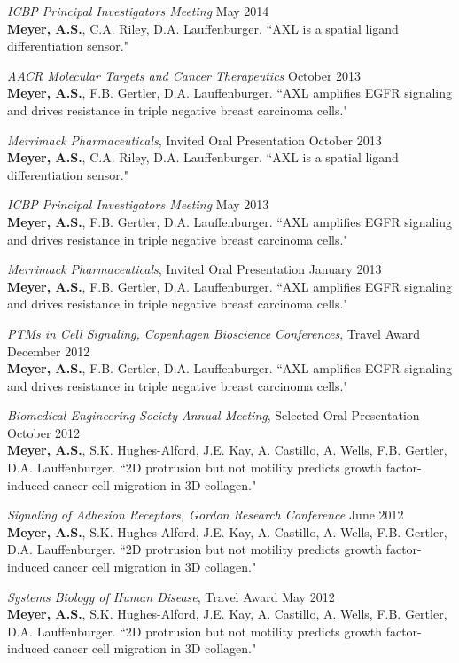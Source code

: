 \documentclass[11pt]{res}
\begin{document}
\begin{resume}
{\sl ICBP Principal Investigators Meeting} \hfill May 2014 \\
{\bf Meyer, A.S.}, C.A. Riley, D.A. Lauffenburger. ``AXL is a spatial ligand differentiation sensor."

{\sl AACR Molecular Targets and Cancer Therapeutics} \hfill October 2013 \\
{\bf Meyer, A.S.}, F.B. Gertler, D.A. Lauffenburger. ``AXL amplifies EGFR signaling and drives resistance in triple negative breast carcinoma cells."

{\sl Merrimack Pharmaceuticals}, Invited Oral Presentation \hfill October 2013 \\
{\bf Meyer, A.S.}, C.A. Riley, D.A. Lauffenburger. ``AXL is a spatial ligand differentiation sensor."

{\sl ICBP Principal Investigators Meeting} \hfill May 2013 \\
{\bf Meyer, A.S.}, F.B. Gertler, D.A. Lauffenburger. ``AXL amplifies EGFR signaling and drives resistance in triple negative breast carcinoma cells."

{\sl Merrimack Pharmaceuticals}, Invited Oral Presentation \hfill January 2013 \\
{\bf Meyer, A.S.}, F.B. Gertler, D.A. Lauffenburger. ``AXL amplifies EGFR signaling and drives resistance in triple negative breast carcinoma cells."

{\sl PTMs in Cell Signaling, Copenhagen Bioscience Conferences}, Travel Award \hfill December 2012 \\
{\bf Meyer, A.S.}, F.B. Gertler, D.A. Lauffenburger. ``AXL amplifies EGFR signaling and drives resistance in triple negative breast carcinoma cells."

{\sl Biomedical Engineering Society Annual Meeting}, Selected Oral Presentation \hfill October 2012 \\
{\bf Meyer, A.S.}, S.K. Hughes-Alford, J.E. Kay, A. Castillo, A. Wells, F.B. Gertler, D.A. Lauffenburger. ``2D protrusion but not motility predicts growth factor-induced cancer cell migration in 3D collagen."

{\sl Signaling of Adhesion Receptors, Gordon Research Conference} \hfill June 2012 \\
{\bf Meyer, A.S.}, S.K. Hughes-Alford, J.E. Kay, A. Castillo, A. Wells, F.B. Gertler, D.A. Lauffenburger. ``2D protrusion but not motility predicts growth factor-induced cancer cell migration in 3D collagen."

{\sl Systems Biology of Human Disease}, Travel Award \hfill May 2012 \\
{\bf Meyer, A.S.}, S.K. Hughes-Alford, J.E. Kay, A. Castillo, A. Wells, F.B. Gertler, D.A. Lauffenburger. ``2D protrusion but not motility predicts growth factor-induced cancer cell migration in 3D collagen."


\end{resume}
\end{document}
